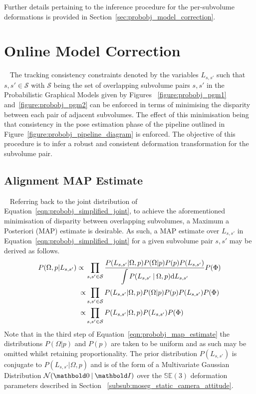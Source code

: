 Further details pertaining to the inference procedure for the per-subvolume
deformations is provided in Section~\ref{sec:probobj_model_correction}.

\section{Online Model Correction}
~\label{sec:probobj_model_correction}
The tracking consistency constraints denoted by the variables \(L_{s, s'}\) such
that \(s, s' \in \mathcal{S}\) with \(\mathcal{S}\) being the set of overlapping
subvolume pairs \(s, s'\) in the Probabilistic Graphical Models given by Figures
~\ref{figure:probobj_pgm1} and~\ref{figure:probobj_pgm2} can be enforced in terms of
minimising the disparity between each pair of adjacent subvolumes. The effect of
this minimisation being that consistency in the pose estimation phase of the
pipeline outlined in Figure~\ref{figure:probobj_pipeline_diagram} is enforced. The
objective of this procedure is to infer a robust and consistent deformation
transformation for the subvolume pair.

\subsection{Alignment MAP Estimate}
~\label{subsec:probobj_alignment_map}
Referring back to the joint distribution of Equation~\ref{eqn:probobj_simplified_joint}, 
to achieve the aforementioned minimisation of disparity between overlapping subvolumes, 
a Maximum a Posteriori (MAP) estimate is desirable. As such, a MAP estimate over \(L_{s, s'}\) 
in Equation~\ref{eqn:probobj_simplified_joint} for a given subvolume pair \(s, s'\) may be
derived as follows.
\begin{align}
  \label{eqn:probobj_map_estimate}
  P(\Omega, p | L_{s, s'}) \propto{}& \prod_{s, s' \in \mathcal{S}}
  \frac{P(L_{s, s'} | \Omega, p) 
  P(\Omega | p)P(p)P(L_{s, s'})}
  {\displaystyle\int P(L_{s, s'} \:\vert\: \Omega, p)
  {\mathrm d{L_{s, s'}}}} P(\Phi) \\
  \propto& \prod_{s, s' \in \mathcal{S}} P(L_{s, s'} | \Omega, p) P(\Omega | p)
  P(p)P(L_{s, s'})P(\Phi) \\
  \propto& \prod_{s, s' \in \mathcal{S}} P(L_{s, s'} | \Omega, p)P(L_{s, s'})
  P(\Phi)
\end{align}
Note that in the third step of Equation~\ref{eqn:probobj_map_estimate} the
distributions \(P(\Omega | p)\) and \(P(p)\) are taken to be uniform and as such may
be omitted whilst retaining proportionality. The prior distribution \(P(L_{s, s'})\) is
conjugate to \(P(L_{s, s'} | \Omega, p)\) and is of the form of a Multivariate
Gaussian Distribution \(\mathcal{N}(\bm{0} \given \bm{I})\) over the
\(\mathbb{SE}(3)\) deformation parameters described in Section 
~\ref{subsub:moseg_static_camera_attitude}. 

